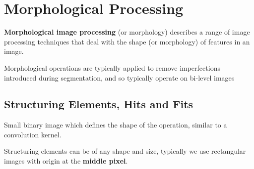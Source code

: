 \section*{Morphological Processing}

\textbf{Morphological image processing} (or morphology) describes a range of image processing techniques that deal with the shape (or morphology) of features in an image.

Morphological operations are typically applied to remove imperfections introduced during segmentation, and so typically operate on bi-level images

\subsection*{Structuring Elements, Hits and Fits}

Small binary image which defines the shape of the operation, similar to a convolution kernel.

Structuring elements can be of any shape and size, typically we use rectangular images with origin at the \textbf{middle pixel}.
